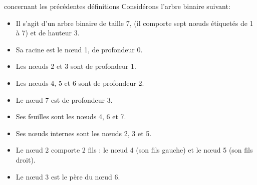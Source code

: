 \begin{exemple}{7.7}{concernant les précédentes définitions}
    Considérons l'arbre binaire suivant:
    \begin{center}
\end{center}
    \begin{itemize}
        \item Il s'agit d'un arbre binaire de taille 7, (il comporte sept nœuds étiquetés de 1 à 7) et de hauteur 3.
        \item Sa racine est le nœud 1, de profondeur 0.
        \item Les nœuds 2 et 3 sont de profondeur 1.
        \item Les nœuds 4, 5 et 6 sont de profondeur 2.
        \item Le nœud 7 est de profondeur 3.
        \item Ses feuilles sont les nœuds 4, 6 et 7.
        \item Ses nœuds internes sont les nœuds 2, 3 et 5.
        \item Le nœud 2 comporte 2 fils : le nœud 4 (son fils gauche) et le nœud 5 (son fils droit).
        \item Le nœud 3 est le père du nœud 6.
    \end{itemize}
\end{exemple}

